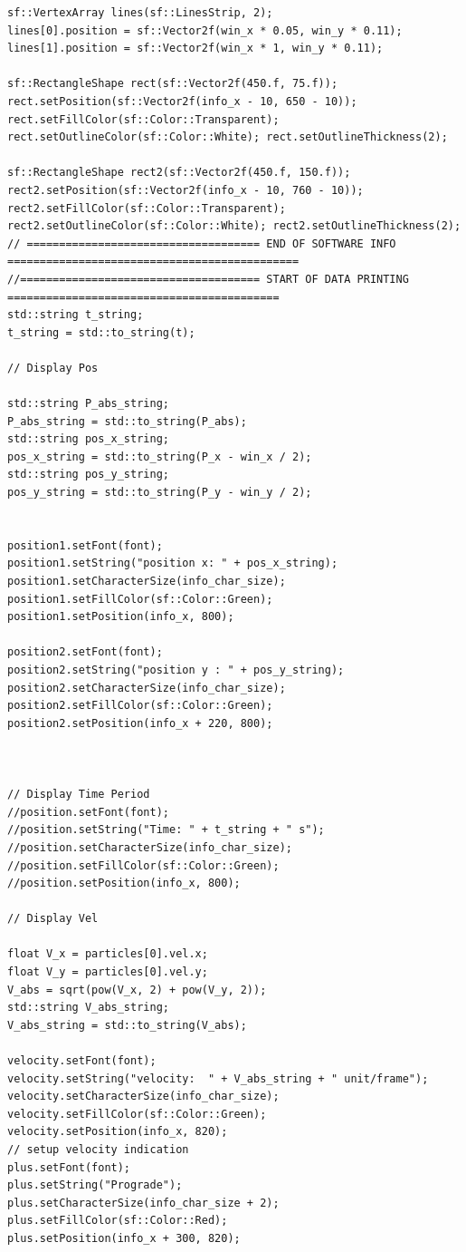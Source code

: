 \documentclass[12pt, letter]{article}
\begin{document}
\begin{verbatim}
sf::VertexArray lines(sf::LinesStrip, 2);
lines[0].position = sf::Vector2f(win_x * 0.05, win_y * 0.11);
lines[1].position = sf::Vector2f(win_x * 1, win_y * 0.11);

sf::RectangleShape rect(sf::Vector2f(450.f, 75.f));
rect.setPosition(sf::Vector2f(info_x - 10, 650 - 10)); rect.setFillColor(sf::Color::Transparent); rect.setOutlineColor(sf::Color::White); rect.setOutlineThickness(2);

sf::RectangleShape rect2(sf::Vector2f(450.f, 150.f));
rect2.setPosition(sf::Vector2f(info_x - 10, 760 - 10)); rect2.setFillColor(sf::Color::Transparent); rect2.setOutlineColor(sf::Color::White); rect2.setOutlineThickness(2);
// ==================================== END OF SOFTWARE INFO =============================================
//===================================== START OF DATA PRINTING ==========================================
std::string t_string;
t_string = std::to_string(t);

// Display Pos

std::string P_abs_string;
P_abs_string = std::to_string(P_abs);
std::string pos_x_string;
pos_x_string = std::to_string(P_x - win_x / 2);
std::string pos_y_string;
pos_y_string = std::to_string(P_y - win_y / 2);


position1.setFont(font);
position1.setString("position x: " + pos_x_string);
position1.setCharacterSize(info_char_size);
position1.setFillColor(sf::Color::Green);
position1.setPosition(info_x, 800);

position2.setFont(font);
position2.setString("position y : " + pos_y_string);
position2.setCharacterSize(info_char_size);
position2.setFillColor(sf::Color::Green);
position2.setPosition(info_x + 220, 800);



// Display Time Period
//position.setFont(font);
//position.setString("Time: " + t_string + " s");
//position.setCharacterSize(info_char_size);
//position.setFillColor(sf::Color::Green);
//position.setPosition(info_x, 800);

// Display Vel

float V_x = particles[0].vel.x;
float V_y = particles[0].vel.y;
V_abs = sqrt(pow(V_x, 2) + pow(V_y, 2));
std::string V_abs_string;
V_abs_string = std::to_string(V_abs);

velocity.setFont(font);
velocity.setString("velocity:  " + V_abs_string + " unit/frame");
velocity.setCharacterSize(info_char_size);
velocity.setFillColor(sf::Color::Green);
velocity.setPosition(info_x, 820);
// setup velocity indication 
plus.setFont(font);
plus.setString("Prograde");
plus.setCharacterSize(info_char_size + 2);
plus.setFillColor(sf::Color::Red);
plus.setPosition(info_x + 300, 820);


\end{verbatim}
\end{document}
